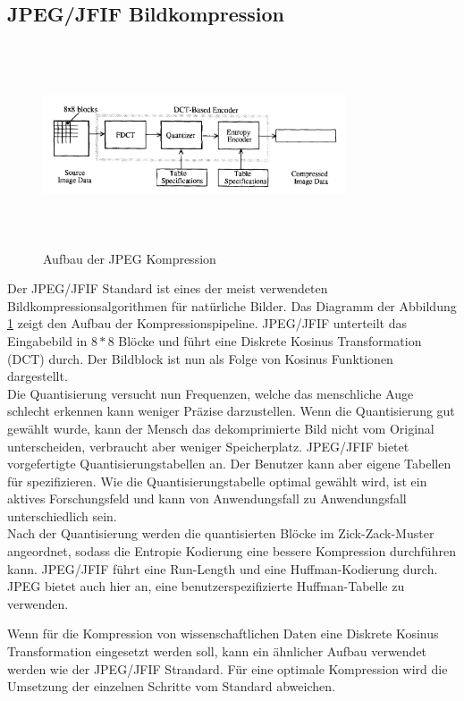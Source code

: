\subsection{JPEG/JFIF Bildkompression}
\begin{figure}[!htbp]
	\center
	\includegraphics[width=0.8\textwidth,height=6cm,keepaspectratio]{./pictures/state/jpeg.png}
	\caption{Aufbau der JPEG Kompression \cite{wallace1992jpeg}}
	\label{state:jpeg:abb}
\end{figure}
Der JPEG/JFIF Standard ist eines der meist verwendeten Bildkompressionsalgorithmen für natürliche Bilder. Das Diagramm der Abbildung \ref{state:jpeg:abb} zeigt den Aufbau der Kompressionspipeline. JPEG/JFIF unterteilt das Eingabebild in $8*8$ Blöcke und führt eine Diskrete Kosinus Transformation (DCT) durch. Der Bildblock ist nun als Folge von Kosinus Funktionen dargestellt.\\
Die Quantisierung versucht nun Frequenzen, welche das menschliche Auge schlecht erkennen kann weniger Präzise darzustellen. Wenn die Quantisierung gut gewählt wurde, kann der Mensch das dekomprimierte Bild nicht vom Original unterscheiden, verbraucht aber weniger Speicherplatz. JPEG/JFIF bietet vorgefertigte Quantisierungstabellen an. Der Benutzer kann aber eigene Tabellen für spezifizieren. Wie die Quantisierungstabelle optimal gewählt wird, ist ein aktives Forschungsfeld \cite{wu1993rate:jpeg} \cite{wang2001designing:jpeg} und kann von Anwendungsfall zu Anwendungsfall unterschiedlich sein.\\
Nach der Quantisierung werden die quantisierten Blöcke im Zick-Zack-Muster angeordnet, sodass die Entropie Kodierung eine bessere Kompression durchführen kann. JPEG/JFIF führt eine Run-Length und eine Huffman-Kodierung durch. JPEG bietet auch hier an, eine benutzerspezifizierte Huffman-Tabelle zu verwenden.

Wenn für die Kompression von wissenschaftlichen Daten eine Diskrete Kosinus Transformation eingesetzt werden soll, kann ein ähnlicher Aufbau verwendet werden wie der JPEG/JFIF Strandard. Für eine optimale Kompression wird die Umsetzung der einzelnen Schritte vom Standard abweichen.

